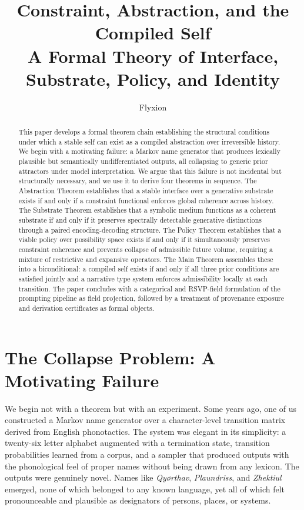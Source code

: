 \documentclass[12pt, a4paper]{article}
\title{\textbf{Constraint, Abstraction, and the Compiled Self}\\
\large A Formal Theory of Interface, Substrate, Policy, and Identity}
\author{Flyxion}
\date{}
\theoremstyle{plain}
\theoremstyle{definition}
\theoremstyle{remark}
\begin{document}
\maketitle

\begin{abstract}
This paper develops a formal theorem chain establishing the structural conditions under which a stable self can exist as a compiled abstraction over irreversible history. We begin with a motivating failure: a Markov name generator that produces lexically plausible but semantically undifferentiated outputs, all collapsing to generic prior attractors under model interpretation. We argue that this failure is not incidental but structurally necessary, and we use it to derive four theorems in sequence. The Abstraction Theorem establishes that a stable interface over a generative substrate exists if and only if a constraint functional enforces global coherence across history. The Substrate Theorem establishes that a symbolic medium functions as a coherent substrate if and only if it preserves spectrally detectable generative distinctions through a paired encoding-decoding structure. The Policy Theorem establishes that a viable policy over possibility space exists if and only if it simultaneously preserves constraint coherence and prevents collapse of admissible future volume, requiring a mixture of restrictive and expansive operators. The Main Theorem assembles these into a biconditional: a compiled self exists if and only if all three prior conditions are satisfied jointly and a narrative type system enforces admissibility locally at each transition. The paper concludes with a categorical and RSVP-field formulation of the prompting pipeline as field projection, followed by a treatment of provenance exposure and derivation certificates as formal objects.
\end{abstract}

\tableofcontents
\newpage

\section{The Collapse Problem: A Motivating Failure}

We begin not with a theorem but with an experiment. Some years ago, one of us constructed a Markov name generator over a character-level transition matrix derived from English phonotactics. The system was elegant in its simplicity: a twenty-six letter alphabet augmented with a termination state, transition probabilities learned from a corpus, and a sampler that produced outputs with the phonological feel of proper names without being drawn from any lexicon. The outputs were genuinely novel. Names like \emph{Qyørthav}, \emph{Plaundriss}, and \emph{Zhektiul} emerged, none of which belonged to any known language, yet all of which felt pronounceable and plausible as designators of persons, places, or systems.
\end{document}
